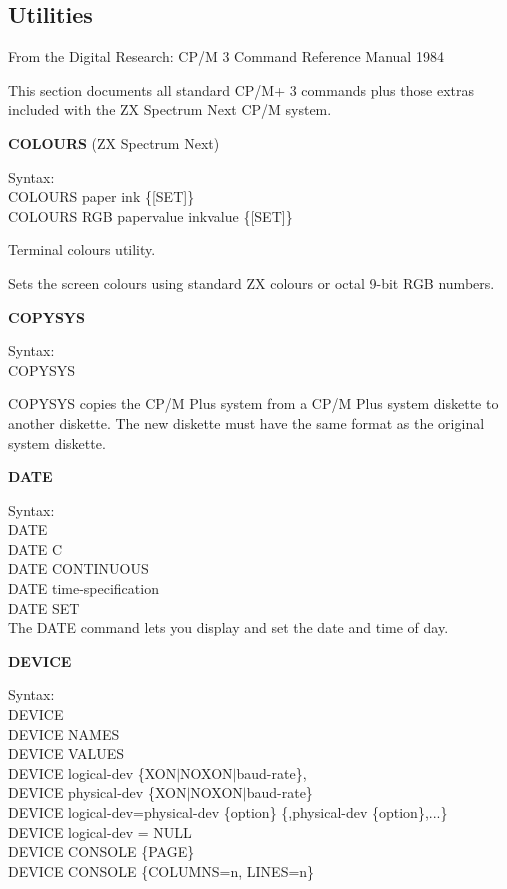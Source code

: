 \subsection{Utilities}

From the Digital Research: CP/M 3 Command Reference Manual 1984

This section documents all standard CP/M+ 3 commands plus those extras
included with the ZX Spectrum Next CP/M system.

\textbf{COLOURS} (ZX Spectrum Next)

\hangindent=0.7cm Syntax:\\
COLOURS paper ink \{[SET]\}\\
COLOURS RGB papervalue inkvalue \{[SET]\}

Terminal colours utility.

Sets the screen colours using standard ZX colours or octal 9-bit RGB
numbers.

\textbf{COPYSYS}

\hangindent=0.7cm Syntax:\\
COPYSYS

COPYSYS copies the CP/M Plus system from a CP/M Plus system diskette
to another diskette.  The new diskette must have the same format as
the original system diskette.

\textbf{DATE}

\hangindent=0.7cm Syntax:\\
DATE\\
DATE C\\
DATE CONTINUOUS\\
DATE time-specification\\
DATE SET\\

The DATE command lets you display and set the date and time of day.

\textbf{DEVICE}

\hangindent=0.7cm Syntax:\\
DEVICE\\
DEVICE NAMES\\
DEVICE VALUES\\
DEVICE logical-dev \{XON\(|\)NOXON\(|\)baud-rate\},\\
DEVICE physical-dev \{XON\(|\)NOXON\(|\)baud-rate\}\\
DEVICE logical-dev=physical-dev \{option\} \{,physical-dev \{option\},...\}\\
DEVICE logical-dev = NULL\\
DEVICE CONSOLE \{PAGE\}\\
DEVICE CONSOLE \{COLUMNS=n, LINES=n\}\\

